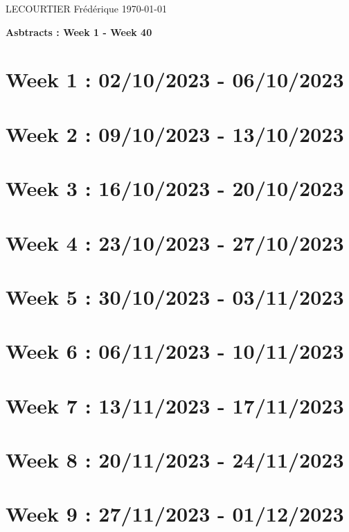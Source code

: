 \documentclass[french]{article}
\begin{document}
	LECOURTIER Frédérique \hfill \today
	\begin{center}
		\Large\textbf{{Asbtracts : Week 1 - Week 40}}
	\end{center}

	\section{Week 1 : 02/10/2023 - 06/10/2023}
	

	\section{Week 2 : 09/10/2023 - 13/10/2023}
	

	\section{Week 3 : 16/10/2023 - 20/10/2023}
	

	\section{Week 4 : 23/10/2023 - 27/10/2023}
	

	\section{Week 5 : 30/10/2023 - 03/11/2023}
	

	\section{Week 6 : 06/11/2023 - 10/11/2023}
	

	\section{Week 7 : 13/11/2023 - 17/11/2023}
	

	\section{Week 8 : 20/11/2023 - 24/11/2023}
	

	\section{Week 9 : 27/11/2023 - 01/12/2023}
	
\end{document}
